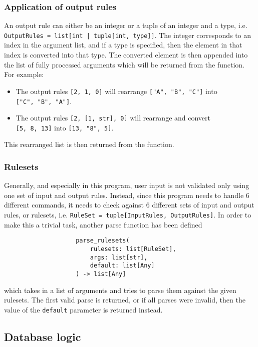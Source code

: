 \documentclass{article}
\begin{document}
			\subsubsection{Application of output rules}
				An output rule can either be an integer or a tuple of an integer and a type, i.e.
				\verb+OutputRules = list[int | tuple[int, type]]+. The integer
				corresponds to an index in the argument list, and if a type is specified, then the element
				in that index is converted into that type. The converted element is then appended into the
				list of fully processed arguments which will be returned from the function. For example:

				\begin{itemize}
					\item The output rules \verb|[2, 1, 0]| will rearrange \verb|["A", "B", "C"]| into \\
					\verb|["C", "B", "A"]|.
					\item The output rules \verb|[2, [1, str], 0]| will rearrange and convert \\
					\verb|[5, 8, 13]| into \verb|[13, "8", 5]|.
				\end{itemize}

				This rearranged list is then returned from the function.

			\subsubsection{Rulesets}
				Generally, and especially in this program, user input is not validated only using one set of
				input and output rules. Instead, since this program needs to handle 6 different commands,
				it needs to check against 6 different sets of input and output rules, or rulesets, i.e.
				\verb|RuleSet = tuple[InputRules, OutputRules]|. In order to make this a trivial task, another
				parse function has been defined

				\begin{verbatim}
					parse_rulesets(
						rulesets: list[RuleSet],
						args: list[str],
						default: list[Any]
					) -> list[Any]
				\end{verbatim}

				which takes in a list of arguments and tries to parse them against the given rulesets. The first
				valid parse is returned, or if all parses were invalid, then the value of the \verb|default|
				parameter is returned instead.

		\subsection{Database logic}
\end{document}
